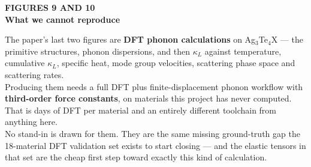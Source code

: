 \documentclass[aspectratio=169]{beamer}
\begin{document}
\begingroup
{}
\begin{frame}[plain]
\vspace{0.9cm}
\begin{center}
{\color{SlideAmber}\bfseries\sffamily\large FIGURES 9 AND 10}\\[8pt]
{\color{white}\bfseries\headingfont\fontsize{25}{30}\selectfont
  What we cannot reproduce}\\[12pt]
\begin{minipage}{0.80\linewidth}
{\color{Subtle}\sffamily\footnotesize
The paper's last two figures are \textbf{DFT phonon calculations} on
Ag$_3$Te$_4$X --- the primitive structures, phonon dispersions, and then
$\kappa_L$ against temperature, cumulative $\kappa_L$, specific heat, mode group
velocities, scattering phase space and scattering rates.\\[8pt]
Producing them needs a full DFT plus finite-displacement phonon workflow with
\textbf{third-order force constants}, on materials this project has never
computed. That is days of DFT per material and an entirely different toolchain
from anything here.\\[8pt]
{\color{white}No stand-in is drawn for them.} They are the same missing
ground-truth gap the 18-material DFT validation set exists to start closing ---
and the elastic tensors in that set are the cheap first step toward exactly
this kind of calculation.}
\end{minipage}
\end{center}
\end{frame}
\endgroup
\end{document}
